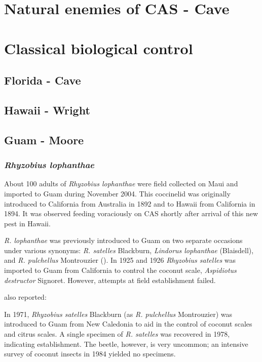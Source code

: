 \documentclass[12pt,letterpaper,english,bibliography=totocnumbered, abstract=on]{scrartcl}
\begin{document}
\cite{haynesExoticInvasivePest2005}

\section{Natural enemies of CAS - Cave}

\section{Classical biological control}

\subsection{Florida - Cave}

\subsection{Hawaii - Wright}

\subsection{Guam - Moore}

\subsubsection{\textit{Rhyzobius lophanthae}}

About 100 adults of \textit{Rhyzobius lophanthae} were field collected on Maui and imported to Guam during November 2004. This coccinelid was originally 
introduced to California from Australia in 1892 and to Hawaii from California in 1894. It was observed feeding voraciously on CAS shortly after arrival of this new pest in Hawaii. 

\textit{R. lophanthae} was previously introduced to Guam on two separate occasions under various synonyms: \textit{R. satelles} Blackburn, \textit{Lindorus lophanthae} (Blaisdell), and \textit{R. pulchellus} Montrouzier (\cite{nafus_biological_1989}).
In 1925 and 1926 \textit{Rhyzobius satelles} was imported to Guam from California to control the coconut scale, \textit{Aspidiotus destructor} Signoret. However, attempts at field establishment failed.  

\cite{nafus_biological_1989} also reported:
\begin{displayquote}
 In 1971, \textit{Rhyzobius satelles} Blackburn (as \textit{R. pulchellus} Montrouzier) was introduced to Guam from New Caledonia to aid in the control of coconut scales and citrus scales. A single specimen of \textit{R. satelles} was recovered in 1978, indicating establishment. The beetle, however, is very uncommon; an intensive survey of coconut insects in 1984 yielded no specimens.
\end{displayquote}
\end{document}
